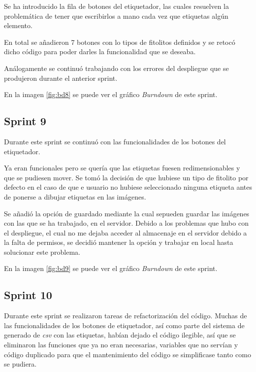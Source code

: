 Se ha introducido la fila de botones del etiquetador, las cuales resuelven la problemática de tener que escribirlos a mano cada vez que etiquetas algún elemento.

En total se añadieron 7 botones con lo tipos de fitolitos definidos y se retocó dicho código para poder darles la funcionalidad que se deseaba.

Análogamente se continuó trabajando con los errores del despliegue que se produjeron durante el anterior sprint.

En la imagen \ref{fig:bd8} se puede ver el gráfico \textit{Burndown} de este sprint.
\subsection{Sprint 9}

Durante este sprint se continuó con las funcionalidades de los botones del etiquetador.

Ya eran funcionales pero se quería que las etiquetas fuesen redimensionables y que se pudiesen mover.
Se tomó la decisión de que hubiese un tipo de fitolito por defecto en el caso de que e usuario no hubiese seleccionado ninguna etiqueta antes de ponerse a dibujar etiquetas en las imágenes.

Se añadió la opción de guardado mediante la cual sepueden guardar las imágenes con las que se ha trabajado, en el servidor. Debido a los problemas que hubo con el despliegue, el cual no me dejaba acceder al almacenaje en el servidor debido a la falta de permisos, se decidió mantener la opción y trabajar en local hasta solucionar este problema.

En la imagen \ref{fig:bd9} se puede ver el gráfico \textit{Burndown} de este sprint.

\subsection{Sprint 10}

Durante este sprint se realizaron tareas de refactorización del código. Muchas de las funcionalidades de los botones de etiquetador, así como parte del sistema de generado de \textit{csv} con las etiquetas, habían dejado el código ilegible, así que se eliminaron las funciones que ya no eran necesarias, variables que no servían y código duplicado para que el mantenimiento del código se simplificase tanto como se pudiera.

